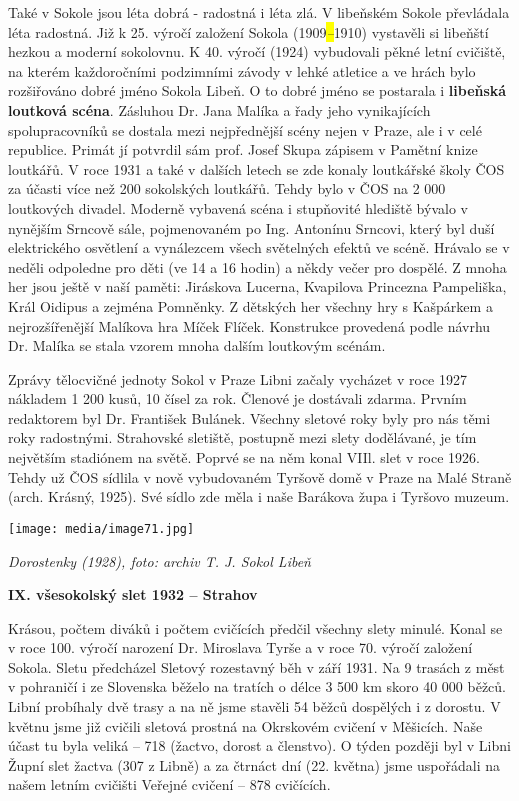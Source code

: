 Také v Sokole jsou léta dobrá - radostná i léta zlá. V libeňském Sokole
převládala léta radostná. Již k 25. výročí založení Sokola
(1909\emph{\hl{--}}1910) vystavěli si libeňští hezkou a moderní
sokolovnu. K 40. výročí (1924) vybudovali pěkné letní cvičiště, na
kterém každoročními podzimními závody v lehké atletice a ve hrách bylo
rozšiřováno dobré jméno Sokola Libeň. O to dobré jméno se postarala i
\textbf{libeňská loutková scéna}. Zásluhou Dr. Jana Malíka a řady jeho
vynikajících spolupracovníků se dostala mezi nejpřednější scény nejen v
Praze, ale i v celé republice. Primát jí potvrdil sám prof. Josef Skupa
zápisem v Pamětní knize loutkářů. V roce 1931 a také v dalších letech se
zde konaly loutkářské školy ČOS za účasti více než 200 sokolských
loutkářů. Tehdy bylo v ČOS na 2 000 loutkových divadel. Moderně vybavená
scéna i stupňovité hlediště bývalo v nynějším Srncově sále, pojmenovaném
po Ing. Antonínu Srncovi, který byl duší elektrického osvětlení a
vynálezcem všech světelných efektů ve scéně. Hrávalo se v neděli
odpoledne pro děti (ve 14 a 16 hodin) a někdy večer pro dospělé. Z mnoha
her jsou ještě v naší paměti: Jiráskova Lucerna, Kvapilova Princezna
Pampeliška, Král Oidipus a zejména Pomněnky. Z dětských her všechny hry
s Kašpárkem a nejrozšířenější Malíkova hra Míček Flíček. Konstrukce
provedená podle návrhu Dr. Malíka se stala vzorem mnoha dalším loutkovým
scénám.

Zprávy tělocvičné jednoty Sokol v Praze Libni začaly vycházet v roce
1927 nákladem 1 200 kusů, 10 čísel za rok. Členové je dostávali zdarma.
Prvním redaktorem byl Dr. František Bulánek. Všechny sletové roky byly
pro nás těmi roky radostnými. Strahovské sletiště, postupně mezi slety
dodělávané, je tím největším stadiónem na světě. Poprvé se na něm konal
VIIl. slet v roce 1926. Tehdy už ČOS sídlila v nově vybudovaném Tyršově
domě v Praze na Malé Straně (arch. Krásný, 1925). Své sídlo zde měla i
naše Barákova župa i Tyršovo muzeum.

\texttt{[image: media/image71.jpg]}

\emph{Dorostenky (1928), foto: archiv T. J. Sokol Libeň}

\textbf{IX. všesokolský slet 1932 -- Strahov}

Krásou, počtem diváků i počtem cvičících předčil všechny slety minulé.
Konal se v roce 100. výročí narození Dr. Miroslava Tyrše a v roce 70.
výročí založení Sokola. Sletu předcházel Sletový rozestavný běh v září
1931. Na 9 trasách z měst v pohraničí i ze Slovenska běželo na tratích o
délce 3 500 km skoro 40 000 běžců. Libní probíhaly dvě trasy a na ně
jsme stavěli 54 běžců dospělých i z dorostu. V květnu jsme již cvičili
sletová prostná na Okrskovém cvičení v Měšicích. Naše účast tu byla
veliká -- 718 (žactvo, dorost a členstvo). O týden později byl v Libni
Župní slet žactva (307 z Libně) a za čtrnáct dní (22. května) jsme
uspořádali na našem letním cvičišti Veřejné cvičení -- 878 cvičících.

